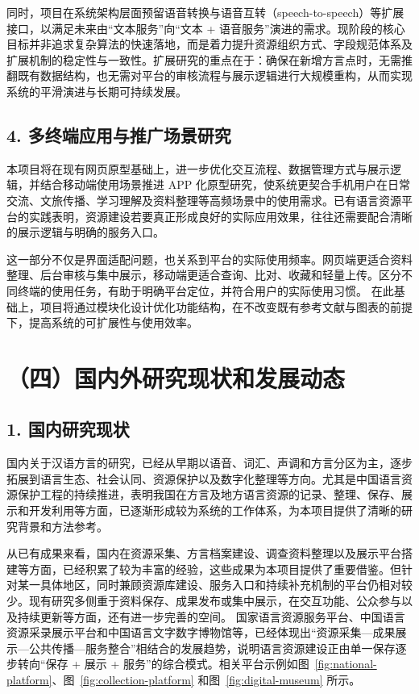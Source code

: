\documentclass[UTF8]{ctexart}
\begin{document}
同时，项目在系统架构层面预留语音转换与语音互转（speech-to-speech）等扩展接口，以满足未来由“文本服务”向“文本 + 语音服务”演进的需求。现阶段的核心目标并非追求复杂算法的快速落地，而是着力提升资源组织方式、字段规范体系及扩展机制的稳定性与一致性。扩展研究的重点在于：确保在新增方言点时，无需推翻既有数据结构，也无需对平台的审核流程与展示逻辑进行大规模重构，从而实现系统的平滑演进与长期可持续发展。

\subsection*{4. 多终端应用与推广场景研究}

本项目将在现有网页原型基础上，进一步优化交互流程、数据管理方式与展示逻辑，并结合移动端使用场景推进 APP 化原型研究，使系统更契合手机用户在日常交流、文旅传播、学习理解及资料整理等高频场景中的使用需求。已有语言资源平台的实践表明，资源建设若要真正形成良好的实际应用效果，往往还需要配合清晰的展示逻辑与明确的服务入口\cite{guojiafuwu,zhongguocaolu,zhongguowenzi}。

这一部分不仅是界面适配问题，也关系到平台的实际使用频率。网页端更适合资料整理、后台审核与集中展示，移动端更适合查询、比对、收藏和轻量上传。区分不同终端的使用任务，有助于明确平台定位，并符合用户的实际使用习惯。
在此基础上，项目将通过模块化设计优化功能结构，在不改变既有参考文献与图表的前提下，提高系统的可扩展性与使用效率。

\section*{（四）国内外研究现状和发展动态}

\subsection*{1. 国内研究现状}

国内关于汉语方言的研究，已经从早期以语音、词汇、声调和方言分区为主，逐步拓展到语言生态、社会认同、资源保护以及数字化整理等方向\cite{cao2015dingwei,liru2001fangyanxue,yuanjia2021gaibao,shilin2017shengtai}。尤其是中国语言资源保护工程的持续推进，表明我国在方言及地方语言资源的记录、整理、保存、展示和开发利用等方面，已逐渐形成较为系统的工作体系\cite{jiaoyubu2024baohu,cao2015dingwei}，为本项目提供了清晰的研究背景和方法参考。

从已有成果来看，国内在资源采集、方言档案建设、调查资料整理以及展示平台搭建等方面，已经积累了较为丰富的经验，这些成果为本项目提供了重要借鉴。但针对某一具体地区，同时兼顾资源库建设、服务入口和持续补充机制的平台仍相对较少。现有研究多侧重于资料保存、成果发布或集中展示，在交互功能、公众参与以及持续更新等方面，还有进一步完善的空间。
国家语言资源服务平台、中国语言资源采录展示平台和中国语言文字数字博物馆等，已经体现出“资源采集—成果展示—公共传播—服务整合”相结合的发展趋势，说明语言资源建设正由单一保存逐步转向“保存 + 展示 + 服务”的综合模式。相关平台示例如图~\ref{fig:national-platform}、图~\ref{fig:collection-platform} 和图~\ref{fig:digital-museum} 所示。
\end{document}
